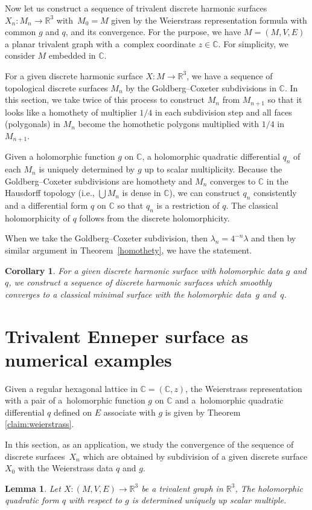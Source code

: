 \documentclass[pdftex]{sigma}
\newcommand{\R}{\mathbb{R}}
\newcommand{\C}{\mathbb{C}}
\newcommand{\1}{{\bf 1}}
\numberwithin{equation}{section}
\newtheorem{Corollary}[Theorem]{Corollary}
\newtheorem{Lemma}[Theorem]{Lemma}
\begin{document}
Now let us construct a sequence of trivalent discrete harmonic surfaces $X_n\colon M_n \to \R^3 $ with~$M_0 =M$ given by the Weierstrass representation formula with common $g$ and $q$, and its convergence.
For the purpose, we have $M=(M,V,E)$ a planar trivalent graph with a~complex coordinate $z \in \C$. For simplicity, we consider $M$ embedded in $\C$.

For a given discrete harmonic surface $X\colon M \to \R^3$,
we have a sequence of topological discrete surfaces $M_n$ by the Goldberg--Coxeter subdivisions in $\C$.
In this section, we take twice of this process to construct $M_n$ from $M_{n+1}$ so that it looks like a homothety of multiplier $1/4$
in each subdivision step and all faces (polygonals) in $M_n$ become the homothetic polygons multiplied with $1/4$ in $M_{n+1}$.

Given a holomorphic function $g$ on $\C$, a holomorphic quadratic differential $q_n$ of each $M_n$ is uniquely determined
by $g$ up to scalar multiplicity.
Because the Goldberg--Coxeter subdivisions are homothety and $M_n$ converges to $\C$ in the Hausdorff topology
(i.e., $\bigcup M_n$ is dense in $\C$),
we can construct $q_n$ consistently and a differential form $q$ on $\C$ so that $q_n$ is a restriction of $q$.
The classical holomorphicity of $q$ follows from the discrete holomorphicity.

When we take the Goldberg--Coxeter subdivision,
then $\lambda_n = 4^{-n} \lambda$ and then by similar argument in Theorem~\ref{homothety}, we have the statement.

\begin{Corollary} \label{claim:homothety:cor}
 For a given discrete harmonic surface with holomorphic data $g$ and $q$,
 we construct a sequence of discrete harmonic surfaces which smoothly converges to a classical minimal surface
 with the holomorphic data~$g$ and~$q$.
\end{Corollary}

\section{Trivalent Enneper surface as numerical examples}\label{sec:numerics}

Given a regular hexagonal lattice in $\C =(\C, z)$,
the Weierstrass representation with a pair of a~holomorphic function $g$ on $\C$ and a~holomorphic quadratic differential $q$ defined on $E$ associate with $g$ is given by Theorem \ref{claim:weierstrass}.

In this section, as an application,
we study the convergence of the sequence of discrete surfaces~$X_n$ which are obtained
by subdivision of a given discrete surface $X_0$ with the Weierstrass data $q$ and $g$.
\begin{Lemma}
 \label{claim:lemma:8:1}
 Let $X\colon  (M,V,E) \to \R^3$ be a trivalent graph in $\R^3$,
 The holomorphic quadratic form $q$ with respect to $g$ is determined uniquely up scalar multiple.
\end{Lemma}
\end{document}
